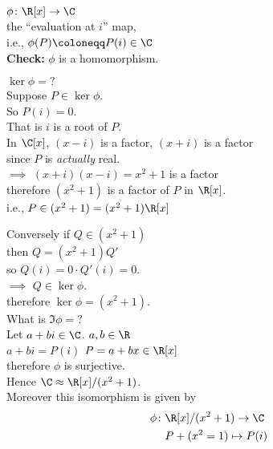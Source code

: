\ex $\phi\colon\R[x]\to\C$ \\
the ``evaluation at $i$'' map, \\
i.e., $\phi(P)\coloneqq P(i)\in\C$ \\
\textbf{Check:} $\phi$ is a homomorphism.

$\ker\phi={?}$ \\
Suppose $P\in\ker\phi$. \\
So $P(i)=0$. \\
That is $i$ is a root of $P$. \\
In $\C[x]$, $(x-i)$ is a factor, $(x+i)$ is a factor \\
since $P$ is \emph{actually} real. \\
$\implies$ $(x+i)(x-i)=x^2+1$ is a factor \\
therefore $(x^2+1)$ is a factor of $P$ in $\R[x]$. \\
i.e., $P\in(x^2+1)=(x^2+1)\R[x]$

Conversely if $Q\in(x^2+1)$ \\
then $Q=(x^2+1)Q'$ \\
so $Q(i)=0\cdot Q'(i) = 0$. \\
$\implies$ $Q\in\ker\phi$. \\
therefore $\ker\phi=(x^2+1)$. \\
What is $\Im\phi=?$ \\
Let $a+bi\in\C$. $a,b\in\R$ \\
$a+bi=P(i)$ \qquad $P=a+bx\in\R[x]$ \\
therefore $\phi$ is surjective. \\
Hence $\C\approx\R[x]/(x^2+1)$. \\
Moreover this isomorphism is given by
\begin{align*}
\phi\colon &  \R[x]/(x^2+1) \to \C \\
& P+(x^2=1) \mapsto P(i)
\end{align*}
